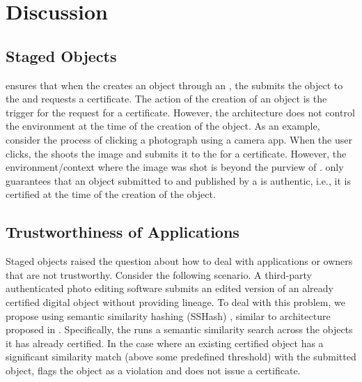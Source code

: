 \section{Discussion}
\label{sec:discussion}


\subsection{Staged Objects}
\name ensures that when the \owner creates an object through an \app, the \app submits the object to the \ta and requests a certificate. The action of the creation of an object is the trigger for the request for a certificate. However, the architecture does not control the environment at the time of the creation of the object. As an example, consider the process of clicking a photograph using a camera app. When the user clicks, the \app shoots the image and submits it to the \ta for a certificate. However, the environment/context where the image was shot is beyond the purview of \name. \name only guarantees that an object submitted to \ta and published by a \publisher is authentic, i.e., it is certified at the time of the creation of the object. 

\subsection{Trustworthiness of Applications}
Staged objects raised the question about how to deal with applications or owners that are not trustworthy. Consider the following scenario. A third-party authenticated photo editing software submits an edited version of an already certified digital object without providing lineage. To deal with this problem, we propose using semantic similarity hashing (SSHash) \cite{sshash-1,sshash-2}, similar to architecture proposed in \cite{qqjs19}. Specifically, the \ta runs a semantic similarity search across the objects it has already certified. In the case where an existing certified object has a significant similarity match (above some predefined threshold) with the submitted object, \ta flags the object as a violation and does not issue a certificate. 

